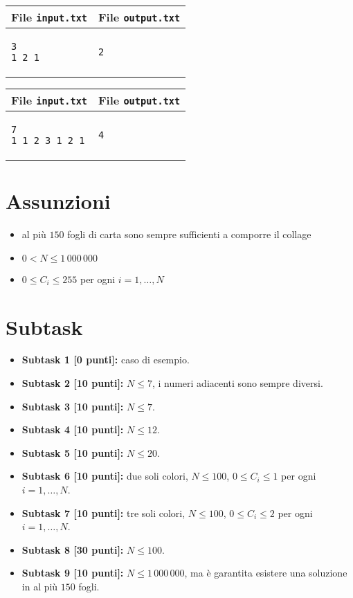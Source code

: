\documentclass[a4paper,11pt]{article}
\begin{document}
  
    \noindent
    \begin{tabular}{p{11cm}|p{5cm}}
    \toprule
    \textbf{File \texttt{input.txt}}
    & \textbf{File \texttt{output.txt}}
    \\
    \midrule
    \scriptsize
    \begin{verbatim}
3 
1 2 1
\end{verbatim}
    &
    \scriptsize
    \begin{verbatim}
2
\end{verbatim}
    \\
    \bottomrule
    \end{tabular}
  
    \noindent
    \begin{tabular}{p{11cm}|p{5cm}}
    \toprule
    \textbf{File \texttt{input.txt}}
    & \textbf{File \texttt{output.txt}}
    \\
    \midrule
    \scriptsize
    \begin{verbatim}
7
1 1 2 3 1 2 1
\end{verbatim}
    &
    \scriptsize
    \begin{verbatim}
4
\end{verbatim}
    \\
    \bottomrule
    \end{tabular}

    
\section*{Assunzioni}
  \begin{itemize}
    \item al più $150$ fogli di carta sono sempre sufficienti a comporre il collage
    \item $0 < N ≤ 1\,000\,000$
    \item $0 \leq C_{i} \leq 255$ per ogni $i=1,\ldots, N$
  \end{itemize}
  
\section*{Subtask}
\begin{itemize}
\item \textbf{Subtask 1 [0 punti]:} caso di esempio.
\item \textbf{Subtask 2 [10 punti]:} $N \leq 7$, i numeri adiacenti sono sempre diversi.
\item \textbf{Subtask 3 [10 punti]:} $N \leq 7$.
\item \textbf{Subtask 4 [10 punti]:} $N \leq 12$.
\item \textbf{Subtask 5 [10 punti]:} $N \leq 20$.
\item \textbf{Subtask 6 [10 punti]:} due soli colori, $N \leq 100$, $0 \leq C_{i} \leq 1$ per ogni $i=1,\ldots, N$.
\item \textbf{Subtask 7 [10 punti]:} tre soli colori, $N \leq 100$, $0 \leq C_{i} \leq 2$ per ogni $i=1,\ldots, N$.
\item \textbf{Subtask 8 [30 punti]:} $N \leq 100$.
\item \textbf{Subtask 9 [10 punti]:} $N \le 1\,000\,000$, ma è garantita esistere una soluzione in al più $150$ fogli.  
\end{itemize}
  
\end{document}
